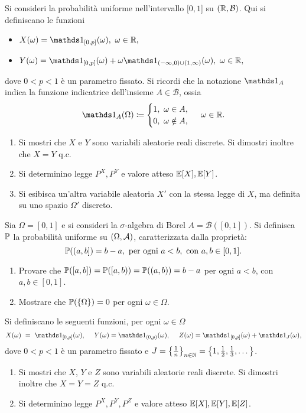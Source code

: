
Si consideri la probabilità uniforme nell'intervallo $[0,1$] su $(\mathbb{R} ,\mathcal{B})$. Qui si definiscano le funzioni
\begin{itemize}
\item $X(\omega) =\Ind_{[0,p]}(\omega) ,\ \omega \in \RR ,$
\item $Y(\omega) =\Ind_{[0,p]}(\omega) +\omega \Ind_{(-\infty ,0) \cup (1,\infty)}(\omega) ,\ \omega \in \RR ,$
\end{itemize}

dove $0< p< 1$ è un parametro fissato. Si ricordi che la notazione $\Ind_{A}$ indica la funzione indicatrice dell'insieme $A\in \mathcal{B}$, ossia
\begin{equation*}
\Ind_{A}(\Omega) \coloneqq
\begin{cases}
1,\ \omega \in A,\\
0,\ \omega \notin A,
\end{cases}
\ \omega \in \RR .
\end{equation*}
\begin{enumerate}
\item Si mostri che $X$ e $Y$ sono variabili aleatorie reali discrete. Si dimostri inoltre che $X=Y$ q.c.
\item Si determinino legge $P^{X} ,P^{Y}$ e valore atteso $\mathbb{E}[X] ,\mathbb{E}[Y]$.
\item Si esibisca un'altra variabile aleatoria $X' $ con la stessa legge di $X$, ma definita su uno spazio $\Omega ' $ discreto.
\end{enumerate}

\Esercizio{}

Sia $\Omega =[0,1]$ e si consideri la $\sigma $-algebra di Borel $A=\mathcal{B}([0,1])$. Si definisca $\mathbb{P}$ la probabilità uniforme su $(\Omega ,\mathcal{A})$, caratterizzata dalla proprietà:
\begin{equation*}
\mathbb{P}((a,b]) =b-a,\ \text{per ogni} \ a< b,\ \text{con} \ a,b\in [0,1] .
\end{equation*}
\begin{enumerate}
\item Provare che $\mathbb{P}([a,b]) =\mathbb{P}([a,b)) =\mathbb{P}((a,b)) =b-a$ per ogni $a< b$, con $a,b\in [0,1]$.
\item Mostrare che $\mathbb{P}(\{\Omega \}) =0$ per ogni $\omega \in \Omega $.
\end{enumerate}

Si definiscano le seguenti funzioni, per ogni $\omega \in \Omega $
\begin{equation*}
X(\omega) \ =\ \Ind_{[0,p]}(\omega) ,\ \ \ \ Y(\omega) =\Ind_{(0,p)}(\omega) ,\ \ \ \ Z(\omega) =\Ind_{[0,p]}(\omega) +\Ind_{J}(\omega) ,
\end{equation*}
dove $0< p< 1$ è un parametro fissato e $J=\left\{\frac{1}{n}\right\}_{n\in \mathbb{N}} =\left\{1,\frac{1}{2} ,\frac{1}{3} ,\dots \right\}$.
\begin{enumerate}
\item Si mostri che $X$, $Y$ e $Z$ sono variabili aleatorie reali discrete. Si dimostri inoltre che $X=Y=Z$ q.c.
\item Si determinino legge $P^{X} ,P^{Y} ,P^{Z}$ e valore atteso $\mathbb{E}[X] ,\mathbb{E}[Y] ,\mathbb{E}[Z]$.
\end{enumerate}

